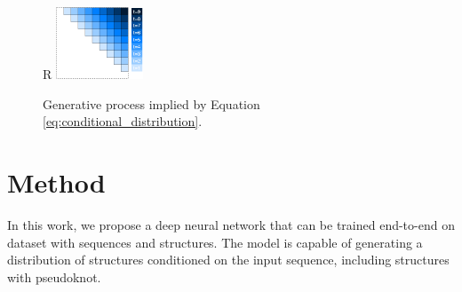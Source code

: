 \documentclass{article}
\begin{document}




%


%
%
%
%


\begin{figure}{R}
    \centering
    \includegraphics[width=0.23\textwidth]{plot/autoregressive_direction.pdf}
    \caption{Generative process implied by Equation \ref{eq:conditional_distribution}.}
    \label{fig:autoregressive_direction}
    \centering
\end{figure}


\section{Method}


In this work, we propose a deep neural network that can be trained end-to-end on dataset with sequences and structures.
The model is capable of generating a distribution of structures conditioned on the input sequence,
including structures with pseudoknot.
\end{document}
